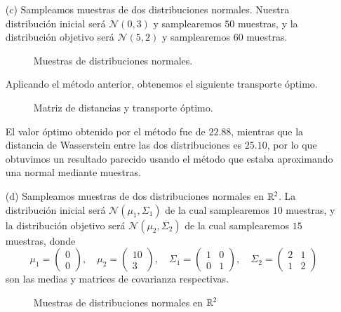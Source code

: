 \documentclass[
	spanish, %
	letterpaper, oneside
]{article}
\begin{document}
\begin{enumerate}
	\item[(c)] Sampleamos muestras de dos distribuciones normales. Nuestra distribución inicial será \(\mathcal N(0,3)\) y samplearemos \(50\) muestras, y la distribución objetivo será \(\mathcal N(5,2)\) y samplearemos \(60\) muestras.
	
	\begin{figure}[H]
		\caption{Muestras de distribuciones normales.}
	\end{figure}
	
	Aplicando el método anterior, obtenemos el siguiente transporte óptimo.
	
	\begin{figure}[H]
		\caption{Matriz de distancias y transporte óptimo.}
	\end{figure}
	
	El valor óptimo obtenido por el método fue de \(22.88\), mientras que la distancia de Wasserstein entre las dos distribuciones es \(25.10\), por lo que obtuvimos un resultado parecido usando el método que estaba aproximando una normal mediante muestras.
	
	\item[(d)] Sampleamos muestras de dos distribuciones normales en \(\mathbb{R}^2\). La distribución inicial será \(\mathcal N(\mu_1,\Sigma_1)\) de la cual samplearemos \(10\) muestras, y la distribución objetivo será \(\mathcal N(\mu_2,\Sigma_2)\) de la cual samplearemos \(15\) muestras, donde\[\mu_1=\begin{pmatrix}
		0\\0
	\end{pmatrix},\quad\mu_2=\begin{pmatrix}
	10\\3
\end{pmatrix},\quad\Sigma_1=\begin{pmatrix}
1&0\\0&1
\end{pmatrix},\quad\Sigma_2=\begin{pmatrix}
2&1\\1&2
\end{pmatrix}\]
son las medias y matrices de covarianza respectivas.
	
	\begin{figure}[H]
		\caption{Muestras de distribuciones normales en \(\mathbb{R}^2\)}
	\end{figure}
	

\end{enumerate}
\end{document}
